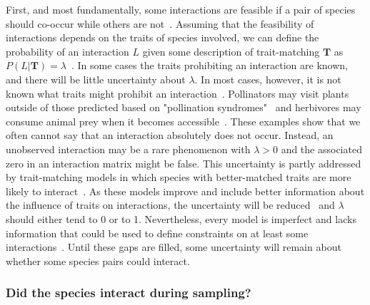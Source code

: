 \documentclass[12pt]{article}
\begin{document}
\begin{spacing}{2.0}
          First, and most fundamentally, some interactions are feasible if a pair of species should co-occur while others are not~\citep{Poisot2015}. Assuming that the feasibility of interactions depends on the traits of species involved, we can define the probability of an interaction $L$ given some description of trait-matching $\mathbf{T}$ as $P(L|\mathbf{T}) = \lambda$~\citep{Bartomeus2013,Gravel2013,Weinstein2017}. 
          In some cases the traits prohibiting an interaction are known, and there will be little uncertainty about $\lambda$.
          In most cases, however, it is not known what traits might prohibit an interaction~\citep{Dormann2017}. Pollinators may visit plants outside of those predicted based on "pollination syndromes"~\citep{Weinstein2017a} and herbivores may consume animal prey when it becomes accessible~\citep{}. These examples show that we often cannot say that an interaction absolutely does not occur. Instead, an unobserved interaction may be a rare phenomenon with $\lambda>0$ and the associated zero in an interaction matrix might be false. This uncertainty is partly addressed by trait-matching models in which species with better-matched traits are more likely to interact~\citep{Bartomeus2016,Jordano2016,Weinstein2017}. As these models improve and include better information about the influence of traits on interactions, the uncertainty will be reduced~\citep{Jordano2016} and $\lambda$ should either tend to 0 or to 1. Nevertheless, every model is imperfect and lacks information that could be used to define constraints on at least some interactions~\citep{Dormann2017}. Until these gaps are filled, some uncertainty will remain about whether some species pairs could interact.


        \subsubsection*{Did the species interact during sampling?} 


\end{spacing}
\end{document}
